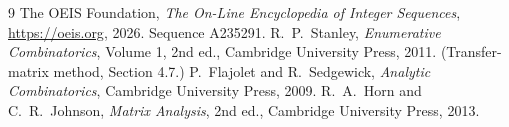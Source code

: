 \documentclass[11pt,a4paper]{article}
\theoremstyle{plain}
\theoremstyle{definition}
\begin{document}
\begin{thebibliography}{9}
 The OEIS Foundation, \emph{The On-Line Encyclopedia of Integer
Sequences}, \url{https://oeis.org}, 2026. Sequence A235291.
 R.~P.~Stanley, \emph{Enumerative Combinatorics}, Volume 1, 2nd ed.,
Cambridge University Press, 2011. (Transfer-matrix method, Section 4.7.)
 P.~Flajolet and R.~Sedgewick, \emph{Analytic Combinatorics}, Cambridge
University Press, 2009.
 R.~A.~Horn and C.~R.~Johnson, \emph{Matrix Analysis}, 2nd ed., Cambridge
University Press, 2013.
\end{thebibliography}
\end{document}
